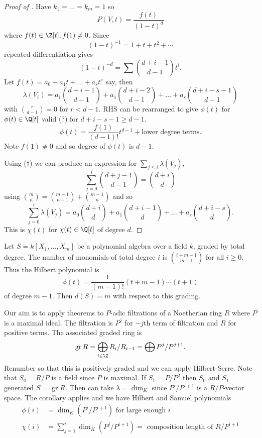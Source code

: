 \documentclass[a4paper]{article}
\DeclareMathOperator{\gr}{gr} %
\begin{document}
\begin{proof}[Proof of ]
  Have \(k_1 = \dots = k_m = 1\) so
  \[
    P(V, t) = \frac{f(t)}{(1 - t)^d}
  \]
  where \(f(t) \in \Z[t], f(1) \neq 0\). Since
  \[
    (1 - t)^{-1} = 1 + t + t^2 + \cdots
  \]
  repeated differentiation gives
  \[
    (1 - t)^{-d} = \sum \binom{d + i - 1}{d - 1} t^i.
  \]
  Let \(f(t) = a_0 + a_1 t + \dots + a_s t^s\) say, then
  \[
    \lambda(V_i) = a_1 \binom{d + i - 1}{d - 1} + a_1 \binom{d + i - 2}{d - 1} + \dots + a_s \binom{d + i - s - 1}{d - 1}
    \tag{\(\dagger\)}
  \]
  with \(\binom{r}{d - 1} = 0\) for \(r < d - 1\). RHS can be rearranged to give \(\phi(t)\) for \(\phi(t) \in \Q[t]\) valid (?) for \(d + i - s - 1 \geq d - 1\).
  \[
    \phi(t) = \frac{f(1)}{(d - 1)!} t^{d - 1} + \text{lower degree terms}.
  \]
  Note \(f(1) \neq 0\) and so degree of \(\phi(t)\) is \(d - 1\).

  Using (\(\dagger\)) we can produce an expression for \(\sum_{j \leq i} \lambda(V_j)\),
  \[
    \sum_{j = 0}^i \binom{d + j - 1}{d - 1} = \binom{d + i}{d}
  \]
  using \(\binom{m}{n} = \binom{m - 1}{n - 1} + \binom{m - 1}{n}\) and so
  \[
    \sum_{j = 0}^i \lambda(V_j) = a_0 \binom{d + i}{d} + a_1 \binom{d + i - 1}{d} + \dots + a_s \binom{d + i - s}{d}.
  \]
  This is \(\chi(t)\) for \(\chi(t) \in \Q[t]\) of degree \(d\).
\end{proof}

\begin{eg}
  Let \(S = k[X_1, \dots, X_m]\) be a polynomial algebra over a field \(k\), graded by total degree. The number of monomials of total degree \(i\) is \(\binom{i + m - 1}{m - 1}\) for all \(i \geq 0\). Thus the Hilbert polynomial is
  \[
    \phi(t) = \frac{1}{(m - 1)!} (t + m - 1) \cdots (t + 1)
  \]
  of degree \(m - 1\). Then \(d(S) = m\) with respect to this grading.
\end{eg}

Our aim is to apply theorems to \(P\)-adic filtrations of a Noetherian ring \(R\) where \(P\) is a maximal ideal. The filtration is \(P^j\) for \(-j\)th term of filtration and \(R\) for positive terms. The associated graded ring is
\[
  \gr R = \bigoplus_{i \in \Z} R_i/R_{i - 1} = \bigoplus P^j/P^{j + 1}.
\]
Renumber so that this is positively graded and we can apply Hilbert-Serre. Note that \(S_0 = R/P\) is a field since \(P\) is maximal. If \(S_1 = P/P^2\) then \(S_0\) and \(S_1\) generated \(S = \gr R\). Then can take \(\lambda = \dim_K\) since \(P^i/P^{i + 1}\) is a \(R/P\)-vector space. The corollary applies and we have Hilbert and Samuel polynomials
\begin{align*}
  \phi(i) &= \dim_K(P^i/P^{i + 1}) \text{ for large enough } i \\
  \chi(i) &= \sum_{j = 1}^i \dim_K(P^j/P^{i + 1}) = \text{ composition length of } R/P^{i + 1}
\end{align*}
\end{document}
